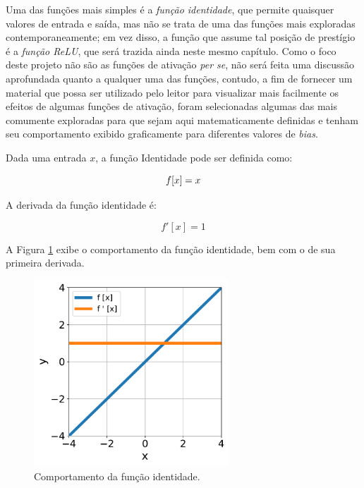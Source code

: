 Uma das funções mais simples é a \textit{função identidade}, que permite quaisquer valores de entrada e saída, mas não se trata de uma das funções mais exploradas contemporaneamente; em vez disso, a função que assume tal posição de prestígio é a \textit{função ReLU}, que será trazida ainda neste mesmo capítulo. Como o foco deste projeto não são as funções de ativação \textit{per se}, não será feita uma discussão aprofundada quanto a qualquer uma das funções, contudo, a fim de fornecer um material que possa ser utilizado pelo leitor para visualizar mais facilmente os efeitos de algumas funções de ativação, foram selecionadas algumas das mais comumente exploradas para que sejam aqui matematicamente definidas e tenham seu comportamento exibido graficamente para diferentes valores de \textit{bias}.


\begin{definition}
    Dada uma entrada $x$, a função Identidade pode ser definida como:

    \begin{equation}
        f[x] = x
        \vspace{0.2cm}
        \label{eq:ann_identity_function}
    \end{equation}

    A derivada da função identidade é:

    \begin{equation}
        f'[x] = 1
        \label{eq:ann_identity_function_dy}
    \end{equation}
    
\end{definition}

A Figura \ref{fig:ann_identity_function} exibe o comportamento da função identidade, bem com o de sua primeira derivada.

\begin{figure}[H]
    \centering
    \includegraphics[width=0.65\textwidth]{figs/ann_identity_function.pdf}
    \caption{Comportamento da função identidade.}
    \label{fig:ann_identity_function}
\end{figure}



